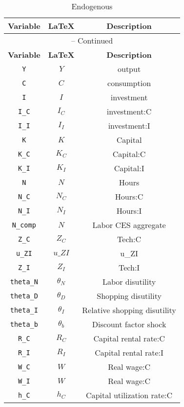 \begin{center}
\begin{longtable}{ccc}
\caption{Endogenous}\\%
\hline%
\multicolumn{1}{c}{\textbf{Variable}} &
\multicolumn{1}{c}{\textbf{\LaTeX}} &
\multicolumn{1}{c}{\textbf{Description}}\\%
\hline\hline%
\endfirsthead
\multicolumn{3}{c}{{\tablename} \thetable{} -- Continued}\\%
\hline%
\multicolumn{1}{c}{\textbf{Variable}} &
\multicolumn{1}{c}{\textbf{\LaTeX}} &
\multicolumn{1}{c}{\textbf{Description}}\\%
\hline\hline%
\endhead
\texttt{Y} & ${Y}$ & output\\
\texttt{C} & ${C}$ & consumption\\
\texttt{I} & ${I}$ & investment\\
\texttt{I\_C} & ${I_C}$ & investment:C\\
\texttt{I\_I} & ${I_I}$ & investment:I\\
\texttt{K} & ${K}$ & Capital\\
\texttt{K\_C} & ${K_C}$ & Capital:C\\
\texttt{K\_I} & ${K_I}$ & Capital:I\\
\texttt{N} & ${N}$ & Hours\\
\texttt{N\_C} & ${N_C}$ & Hours:C\\
\texttt{N\_I} & ${N_I}$ & Hours:I\\
\texttt{N\_comp} & ${N}$ & Labor CES aggregate\\
\texttt{Z\_C} & ${Z_C}$ & Tech:C\\
\texttt{u\_ZI} & $u\_ZI$ & u\_ZI\\
\texttt{Z\_I} & ${Z_I}$ & Tech:I\\
\texttt{theta\_N} & ${\theta_N}$ & Labor disutility\\
\texttt{theta\_D} & ${\theta_D}$ & Shopping disutility\\
\texttt{theta\_I} & ${\theta_I}$ & Relative shopping disutility\\
\texttt{theta\_b} & ${\theta_b}$ & Discount factor shock\\
\texttt{R\_C} & ${R_C}$ & Capital rental rate:C\\
\texttt{R\_I} & ${R_I}$ & Capital rental rate:I\\
\texttt{W\_C} & ${W}$ & Real wage:C\\
\texttt{W\_I} & ${W}$ & Real wage:C\\
\texttt{h\_C} & ${h_C}$ & Capital utilization rate:C\\

\end{longtable}
\end{center}

